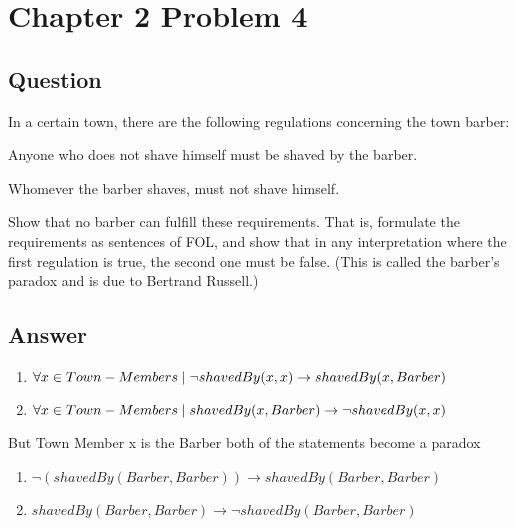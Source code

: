 \documentclass[10pt]{article}
\newcommand{\suchthat}{\;\ifnum\currentgrouptype=16 \middle\fi|\;}
\begin{document}
\section{Chapter 2 Problem 4}
\subsection{Question}
In a certain town, there are the following regulations
concerning the town barber:

Anyone who does not shave himself must be shaved
by the barber.

Whomever the barber shaves, must not shave himself.

Show that no barber can fulﬁll these requirements. That is, formulate the
requirements as sentences of FOL, and show that in any interpretation where
the ﬁrst regulation is true, the second one must be false.
(This is called the barber’s paradox and is due to Bertrand Russell.)

\subsection{Answer}

\begin{enumerate}
	\item $\forall x \in Town-Members \suchthat \lnot shavedBy(x,x) \to shavedBy(x,Barber) $
	\item $\forall x \in Town-Members \suchthat shavedBy(x,Barber) \to \lnot shavedBy(x, x) $
\end{enumerate}

But Town Member x is the Barber both of the statements become a paradox

\begin{enumerate}  
	\item $ \lnot(shavedBy(Barber,Barber)) \to shavedBy(Barber,Barber)$
	\item $ shavedBy(Barber,Barber) \to \lnot shavedBy(Barber,Barber)$
\end{enumerate} 
\end{document}

